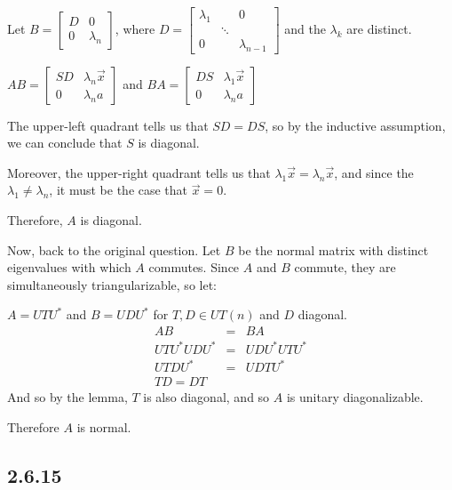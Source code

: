 \documentclass[letterpaper,12pt,fleqn]{article}
\renewcommand{\l}{\lambda}
\newcommand{\vx}{\vec{x}}
\renewcommand{\l}{\lambda}
\begin{document}
\begin{description}
\begin{theproof}
\begin{description}
      Let $B=\left[\begin{array}{c|c} D & 0 \\ \hline 0 & \l_n \end{array}\right]$, where
      $D=\begin{bmatrix} \l_1 & & 0 \\ & \ddots & \\ 0 & & \l_{n-1} \end{bmatrix}$ and
      the $\l_k$ are distinct.

      $AB=\left[\begin{array}{c|c} SD & \l_n\vx \\ \hline 0 & \l_na \end{array}\right]$
      and
      $BA=\left[\begin{array}{c|c} DS & \l_1\vx \\ \hline 0 & \l_na \end{array}\right]$

      The upper-left quadrant tells us that $SD=DS$, so by the inductive assumption, we
      can conclude that $S$ is diagonal.

      Moreover, the upper-right quadrant tells us that $\l_1\vx=\l_n\vx$, and since the
      $\l_1\ne\l_n$, it must be the case that $\vx=0$.

      Therefore, $A$ is diagonal.

      Now, back to the original question. Let $B$ be the normal matrix with distinct
      eigenvalues with which $A$ commutes. Since $A$ and $B$ commute, they are
      simultaneously triangularizable, so let:

      $A=UTU^*$ and $B=UDU^*$ for $T,D\in UT(n)$ and $D$ diagonal.
      \begin{eqnarray*}
        AB &=& BA \\
        UTU^*UDU^* &=& UDU^*UTU^* \\
        UTDU^* &=& UDTU^* \\
        TD=DT
      \end{eqnarray*}
      And so by the lemma, $T$ is also diagonal, and so $A$ is unitary diagonalizable.

      Therefore $A$ is normal.
    \end{description}
  \end{theproof}
  
\end{description}

\subsection*{2.6.15}
\end{document}
